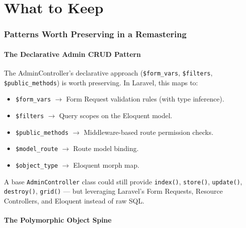 \documentclass[11pt,a4paper]{article}
\begin{document}
\part{What to Keep}\label{part:keep}

\section{Patterns Worth Preserving in a Remastering}\label{sec:keep}

\subsection{The Declarative Admin CRUD Pattern}

\begin{reusebox}
The AdminController's declarative approach (\texttt{\$form\_vars},
\texttt{\$filters}, \texttt{\$public\_methods}) is worth preserving.
In Laravel, this maps to:
\begin{itemize}[leftmargin=1.6em,itemsep=2pt]
  \item \texttt{\$form\_vars} $\to$ Form Request validation rules
        (with type inference).
  \item \texttt{\$filters} $\to$ Query scopes on the Eloquent model.
  \item \texttt{\$public\_methods} $\to$ Middleware-based route
        permission checks.
  \item \texttt{\$model\_route} $\to$ Route model binding.
  \item \texttt{\$object\_type} $\to$ Eloquent morph map.
\end{itemize}
A base \texttt{AdminController} class could still provide
\texttt{index()}, \texttt{store()}, \texttt{update()},
\texttt{destroy()}, \texttt{grid()} --- but leveraging Laravel's
Form Requests, Resource Controllers, and Eloquent instead of raw
SQL.
\end{reusebox}

\subsection{The Polymorphic Object Spine}
\end{document}
